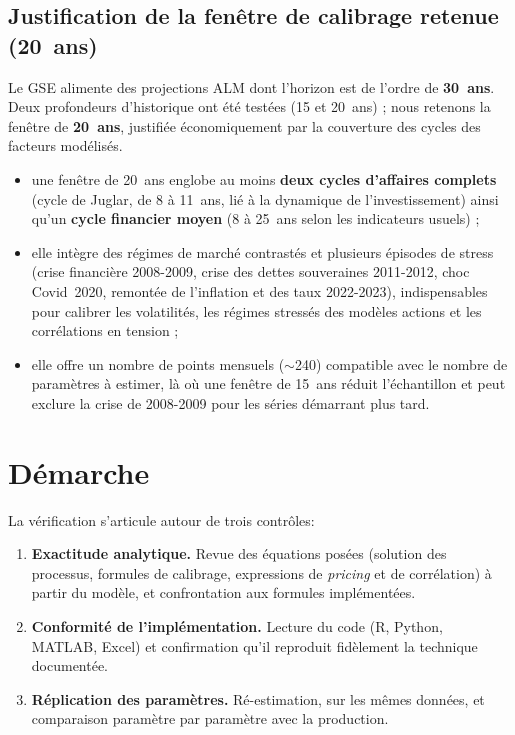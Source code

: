 \documentclass[11pt,a4paper]{article}
\begin{document}
\subsection{Justification de la fenêtre de calibrage retenue (20~ans)}
\label{sec:fenetre}

Le GSE alimente des projections ALM dont l'horizon est de l'ordre de \textbf{30~ans}. Deux profondeurs d'historique ont été testées (15 et 20~ans) ; nous retenons la fenêtre de \textbf{20~ans}, justifiée économiquement par la couverture des cycles des facteurs modélisés.

\begin{itemize}
  \item une fenêtre de 20~ans englobe au moins \textbf{deux cycles d'affaires complets} (cycle de Juglar, de 8 à 11~ans, lié à la dynamique de l'investissement) ainsi qu'un \textbf{cycle financier moyen} (8 à 25~ans selon les indicateurs usuels) ;
  \item elle intègre des régimes de marché contrastés et plusieurs épisodes de stress (crise financière 2008-2009, crise des dettes souveraines 2011-2012, choc Covid~2020, remontée de l'inflation et des taux 2022-2023), indispensables pour calibrer les volatilités, les régimes stressés des modèles actions et les corrélations en tension ;
  \item elle offre un nombre de points mensuels ($\sim$240) compatible avec le nombre de paramètres à estimer, là où une fenêtre de 15~ans réduit l'échantillon et peut exclure la crise de 2008-2009 pour les séries démarrant plus tard.
\end{itemize}

\clearpage

\section{Démarche}

La vérification s'articule autour de trois contrôles:

\begin{enumerate}
  \item \textbf{Exactitude analytique.} Revue des équations posées (solution des processus, formules de calibrage, expressions de \emph{pricing} et de corrélation) à partir du modèle, et confrontation aux formules implémentées.
  \item \textbf{Conformité de l'implémentation.} Lecture du code (R, Python, MATLAB, Excel) et confirmation qu'il reproduit fidèlement la technique documentée.
  \item \textbf{Réplication des paramètres.} Ré-estimation, sur les mêmes données, et comparaison paramètre par paramètre avec la production.
\end{enumerate}
\end{document}
